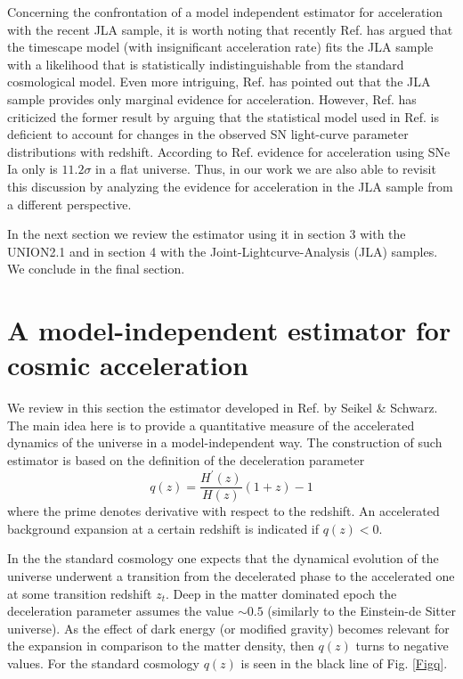 \documentclass[nofootinbib,twocolumn]{revtex4}
\begin{document}
Concerning the confrontation of a model independent estimator for acceleration with the recent JLA sample, it is worth noting that
recently Ref. \cite{Dam:2017xqs} has argued that the timescape model (with insignificant acceleration rate) fits the JLA sample with a likelihood that is
statistically indistinguishable from the standard cosmological model. Even more intriguing, Ref.\cite{Nielsen:2015pga} has pointed out that the JLA sample provides only marginal evidence for acceleration. However, Ref. \cite{Rubin:2016iqe} has criticized the former result by arguing that the statistical model used in Ref.\cite{Nielsen:2015pga} is deficient to account for
changes in the observed SN light-curve parameter distributions with redshift. According to Ref. \cite{Rubin:2016iqe} evidence for acceleration using SNe Ia only is $11.2 \sigma$ in a flat universe. Thus, in our work we are also able to revisit this discussion by analyzing the evidence for acceleration in the JLA sample from a different perspective.

In the next section we review the estimator using it in section 3 with the UNION2.1 \cite{Suzuki:2011hu} and in section 4 with the Joint-Lightcurve-Analysis (JLA) \cite{Betoule:2014frx} samples. We conclude in the final section.

\section{A model-independent estimator for cosmic acceleration}

We review in this section the estimator developed in Ref. \cite{Seikel:2007pk} by Seikel \& Schwarz. The main idea here is to provide a quantitative measure of the accelerated dynamics of the universe in a model-independent way. The construction of such estimator is based on the definition of the deceleration parameter
\begin{equation}\label{qz}
q(z) = \frac{H^{\prime}(z)}{H(z)} (1+z) - 1 
\end{equation}
where the prime denotes derivative with respect to the redshift. An accelerated background expansion at a certain redshift is indicated if $q(z)<0$. 

In the the standard cosmology one expects that the dynamical evolution of the universe underwent a transition from the decelerated phase to the accelerated one at some transition redshift $z_t$. Deep in the matter dominated epoch the deceleration parameter assumes the value $\sim 0.5$ (similarly to the Einstein-de Sitter universe). As the effect of dark energy (or modified gravity) becomes relevant for the expansion in comparison to the matter density, then $q(z)$ turns to negative values. For the standard cosmology $q(z)$ is seen in the black line of Fig. {\ref{Figq}}.
\end{document}

